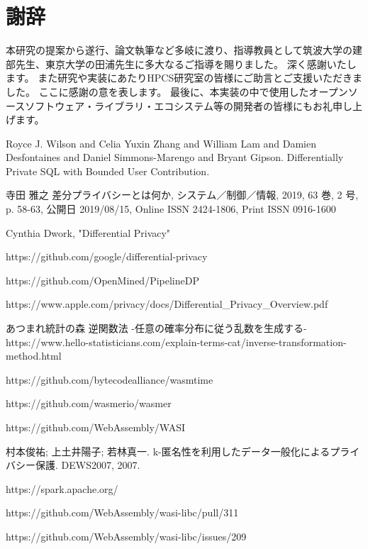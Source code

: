 \documentclass[a4paper,11pt]{jreport}
\begin{document}
\chapter*{謝辞}

本研究の提案から遂行、論文執筆など多岐に渡り、指導教員として筑波大学の建部先生、東京大学の田浦先生に多大なるご指導を賜りました。
深く感謝いたします。
また研究や実装にあたりHPCS研究室の皆様にご助言とご支援いただきました。
ここに感謝の意を表します。
最後に、本実装の中で使用したオープンソースソフトウェア・ライブラリ・エコシステム等の開発者の皆様にもお礼申し上げます。

\newpage

\renewcommand{\bibname}{参考文献}

%
%

\begin{thebibliography}{1}
    Royce J. Wilson and
    Celia Yuxin Zhang and
    William Lam and
    Damien Desfontaines and
    Daniel Simmons-Marengo and
    Bryant Gipson.
    \newblock Differentially Private SQL with Bounded User Contribution.

    寺田 雅之
    \newblock  差分プライバシーとは何か, システム／制御／情報, 2019, 63 巻, 2 号, p. 58-63, 公開日 2019/08/15, Online ISSN 2424-1806, Print ISSN 0916-1600

    Cynthia Dwork, "Differential Privacy"

    https://github.com/google/differential-privacy

    https://github.com/OpenMined/PipelineDP

    \newblock https://www.apple.com/privacy/docs/Differential\_Privacy\_Overview.pdf

    あつまれ統計の森
    \newblock 逆関数法 -任意の確率分布に従う乱数を生成する- https://www.hello-statisticians.com/explain-terms-cat/inverse-transformation-method.html

    https://github.com/bytecodealliance/wasmtime

    https://github.com/wasmerio/wasmer

    https://github.com/WebAssembly/WASI

    村本俊祐; 上土井陽子; 若林真一. k-匿名性を利用したデータ一般化によるプライバシー保護. DEWS2007, 2007.

    https://spark.apache.org/

    https://github.com/WebAssembly/wasi-libc/pull/311

    https://github.com/WebAssembly/wasi-libc/issues/209

\end{thebibliography}
\end{document}
